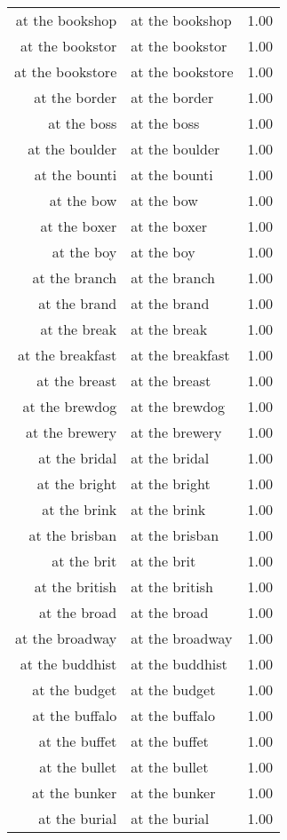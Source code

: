 \begin{table}[ht]
\begin{tabular}{rlr}
  at the bookshop & at the bookshop & 1.00 \\ 
  at the bookstor & at the bookstor & 1.00 \\ 
  at the bookstore & at the bookstore & 1.00 \\ 
  at the border & at the border & 1.00 \\ 
  at the boss & at the boss & 1.00 \\ 
  at the boulder & at the boulder & 1.00 \\ 
  at the bounti & at the bounti & 1.00 \\ 
  at the bow & at the bow & 1.00 \\ 
  at the boxer & at the boxer & 1.00 \\ 
  at the boy & at the boy & 1.00 \\ 
  at the branch & at the branch & 1.00 \\ 
  at the brand & at the brand & 1.00 \\ 
  at the break & at the break & 1.00 \\ 
  at the breakfast & at the breakfast & 1.00 \\ 
  at the breast & at the breast & 1.00 \\ 
  at the brewdog & at the brewdog & 1.00 \\ 
  at the brewery & at the brewery & 1.00 \\ 
  at the bridal & at the bridal & 1.00 \\ 
  at the bright & at the bright & 1.00 \\ 
  at the brink & at the brink & 1.00 \\ 
  at the brisban & at the brisban & 1.00 \\ 
  at the brit & at the brit & 1.00 \\ 
  at the british & at the british & 1.00 \\ 
  at the broad & at the broad & 1.00 \\ 
  at the broadway & at the broadway & 1.00 \\ 
  at the buddhist & at the buddhist & 1.00 \\ 
  at the budget & at the budget & 1.00 \\ 
  at the buffalo & at the buffalo & 1.00 \\ 
  at the buffet & at the buffet & 1.00 \\ 
  at the bullet & at the bullet & 1.00 \\ 
  at the bunker & at the bunker & 1.00 \\ 
  at the burial & at the burial & 1.00 \\ 

\end{tabular}
\end{table}
